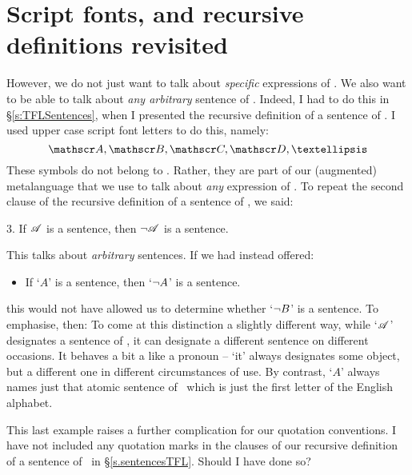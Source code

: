\section{Script fonts, and recursive definitions revisited}
However, we do not just want to talk about \emph{specific} expressions of \TFL. We also want to be able to talk about \emph{any arbitrary} sentence of \TFL. Indeed, I had to do this in §\ref{s:TFLSentences}, when I presented the recursive definition of a sentence of \TFL. I used upper case script font letters to do this, namely:
	$$\meta{A}, \meta{B}, \meta{C}, \meta{D}, …$$
These symbols do not belong to \TFL. Rather, they are part of our (augmented) metalanguage that we use to talk about \emph{any} expression of \TFL. To repeat the second clause of the recursive definition of a sentence of \TFL, we said:
	\begin{earg}
		\item[3.] If $\mathscr{A}$ is a sentence, then $\neg \mathscr{A}$ is a sentence.
	\end{earg}
This talks about \emph{arbitrary} sentences. If we had instead offered:
	\begin{itemize}
		\item If `$A$' is a sentence, then `$\neg A$' is a sentence.
	\end{itemize}
this would not have allowed us to determine whether `$\neg B$' is a sentence. To emphasise, then:
To come at this distinction a slightly different way, while `$\mathscr{A}$' designates a sentence of \TFL, it can designate a different sentence on different occasions. It behaves a bit a like a pronoun – `it' always designates some object, but a different one in different circumstances of use. By contrast, `$A$' always names just that atomic sentence of \TFL\ which is just the first letter of the English alphabet.  

This last example raises a further complication for our quotation conventions. I have not included any quotation marks in the clauses of our recursive definition of a sentence of \TFL\ in §\ref{s.sentencesTFL}. Should I have done so?


